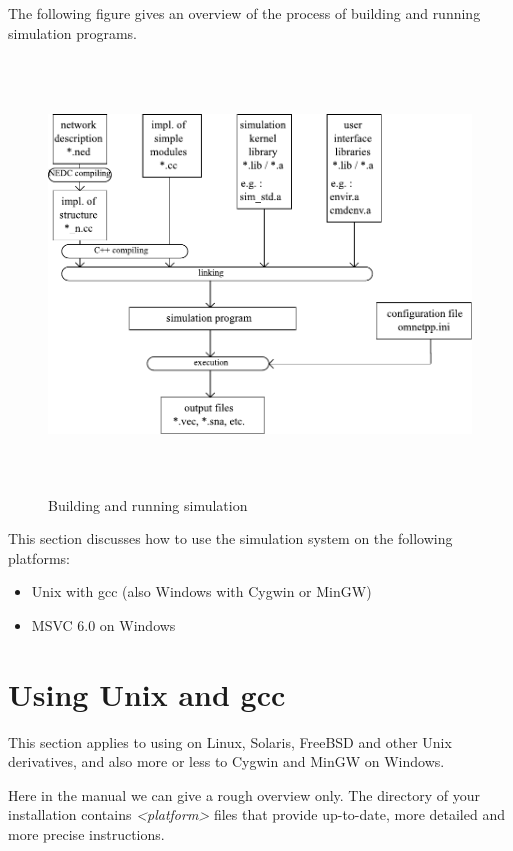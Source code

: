 The following figure gives an overview of the process of building
and running simulation programs.


\begin{figure}[htbp]
  \begin{center}
    \includegraphics[width=5.992in, height=4.519in]{figures/usmanFig17}
    \caption{Building and running simulation}
  \end{center}
\end{figure}


This section discusses how to use the simulation system on the
following platforms:
\begin{itemize}
  \item{Unix with gcc (also Windows with Cygwin or MinGW)}
  \item{MSVC 6.0 on Windows}
\end{itemize}




\section{Using Unix and gcc}

This section applies to using {\opp} on Linux, Solaris, FreeBSD and
other Unix derivatives, and also more or less to Cygwin and MinGW
on Windows.

Here in the manual we can give a rough overview only.
The  directory of your {\opp} installation contains
\textit{<platform>} files that provide
up-to-date, more detailed and more precise instructions.


